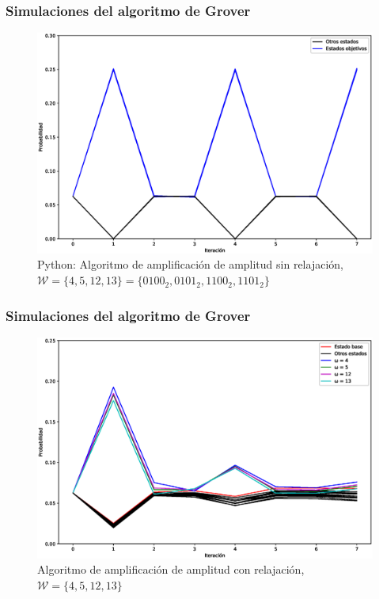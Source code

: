 \documentclass[xetex,mathserif,serif, 8pt]{beamer}
\begin{document}
\begin{frame}
    \frametitle{Simulaciones del algoritmo de Grover}
    \begin{figure}[H]
        \centering
        \includegraphics[width=0.9\linewidth]{img/grover3lossless.eps}
        \caption{Python: Algoritmo de amplificación de amplitud sin relajación, $\mathcal{W} = \{4, 5, 12, 13\} = \{0100_2, 0101_2, 1100_2, 1101_2\}$}
    \end{figure}

\end{frame}

\begin{frame}
    \frametitle{Simulaciones del algoritmo de Grover}
    \vspace{-0.5cm}
    \begin{figure}[H]
        \centering
        \includegraphics[width=0.99\linewidth]{img/grover3loss.eps}
        \caption{Algoritmo de amplificación de amplitud con relajación, $\mathcal{W} = \{4, 5, 12, 13\}$}
    \end{figure}

\end{frame}
\end{document}
